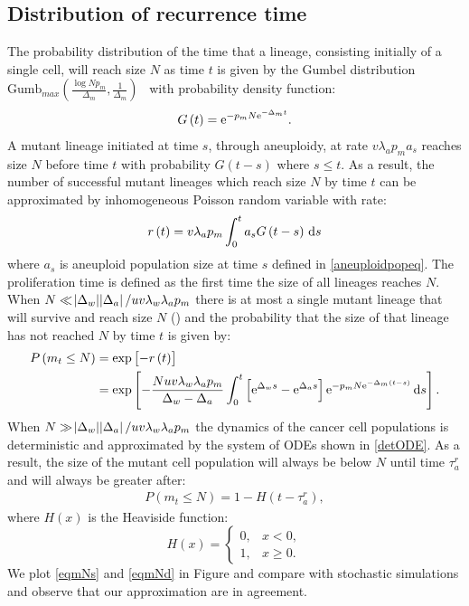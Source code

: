 \documentclass[12pt]{extarticle}
\renewcommand{\d}[1]{\ensuremath{\operatorname{d}\!{#1}}}
\renewcommand{\d}{{\rm d}}
\newcommand{\e}{{\rm e}}
\begin{document}
\begin{appendices}
\section{Distribution of recurrence time}
The probability distribution of the time that a lineage, consisting initially of a single cell, will reach size $N$ as time $t$ is given by the Gumbel distribution $\text{Gumb}_{max}\left(\frac{\log Np_m}{\Delta_m},\frac{1}{\Delta_m}\right)$~\citep{avanzini2019cancer} with probability density function:
\begin{align*}
G\left(t\right)=\e^{-p_mN\e^{-\Delta_mt}}.
\end{align*}
A mutant lineage initiated at time $s$, through aneuploidy, at rate $v\lambda_ap_ma_s$ reaches size $N$ before time $t$ with probability $G\left(t-s\right)$ where $s\leq t$. As a result, the number of successful mutant lineages which reach size $N$ by time $t$ can be approximated by inhomogeneous Poisson random variable with rate:
\begin{align*}
r\left(t\right)=v\lambda_ap_m\int_0^t a_sG\left(t-s\right)\,\d s
\end{align*}
where $a_s$ is aneuploid population size at time $s$ defined in \cref{aneuploidpopeq}. The proliferation time is defined as the first time the size of all lineages reaches $N$. When $N\ll\abs{\Delta_w}\abs{\Delta_a}/uv\lambda_w\lambda_ap_m$ there is at most a single mutant lineage that will survive and reach size $N$ () and the probability that the size of that lineage has not reached $N$ by time $t$ is given by:
\begin{align}\nonumber
P\left(m_t\leq N\right)&=\exp\left[-r\left(t\right)\right]\\ \label{eqmNs}
&=\exp\left[-\frac{Nuv\lambda_w\lambda_ap_m}{\Delta_w-\Delta_a}\int_0^t\left[\e^{\Delta_ws}-\e^{\Delta_as}\right]\e^{-p_mN\e^{-\Delta_m\left(t-s\right)}}\,\d s\right].
\end{align}
When $N\gg\abs{\Delta_w}\abs{\Delta_a}/uv\lambda_w\lambda_ap_m$ the dynamics of the cancer cell populations is deterministic and approximated by the system of ODEs shown in \cref{detODE}. As a result, the size of the mutant cell population will always be below $N$ until time $\tau_a^r$ and will always be greater after:
\begin{align}\label{eqmNd}
P\left(m_t\leq N\right)=1-H\left(t-\tau_a^r\right),
\end{align}
where $H(x)$ is the Heaviside function:
\begin{equation*}
H\left(x\right) = \begin{cases}
    0 ,&
  x<0 ,\\ 
  1 ,&
  x\geq0 .
  \end{cases}
\end{equation*}
We plot \cref{eqmNs} and \cref{eqmNd} in Figure and compare with stochastic simulations and observe that our approximation are in agreement. 


\end{appendices}
\end{document}
